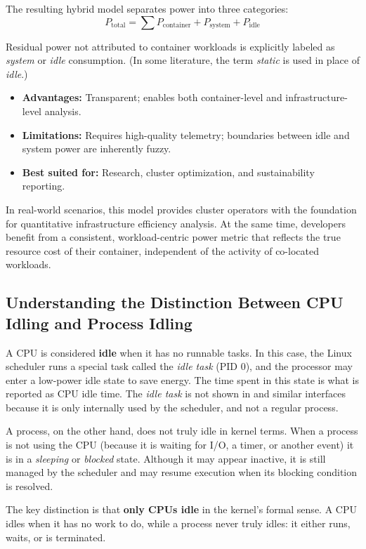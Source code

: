 The resulting hybrid model separates power into three categories:
\begin{equation}
    P_\text{total} = \sum P_\text{container} + P_\text{system} + P_\text{idle}
\end{equation}

Residual power not attributed to container workloads is explicitly labeled as \textit{system} or \textit{idle} consumption. (In some literature, the term \textit{static} is used in place of \textit{idle}.)

\begin{itemize}
    \item \textbf{Advantages:} Transparent; enables both container-level and infrastructure-level analysis.
    \item \textbf{Limitations:} Requires high-quality telemetry; boundaries between idle and system power are inherently fuzzy.
    \item \textbf{Best suited for:} Research, cluster optimization, and sustainability reporting.
\end{itemize}

In real-world scenarios, this model provides cluster operators with the foundation for quantitative infrastructure efficiency analysis. At the same time, developers benefit from a consistent, workload-centric power metric that reflects the true resource cost of their container, independent of the activity of co-located workloads.

\subsection{Understanding the Distinction Between CPU Idling and Process Idling}
A CPU is considered \textbf{idle} when it has no runnable tasks. In this case, the Linux scheduler runs a special task called the \textit{idle task} (PID 0), and the processor may enter a low-power idle state to save energy. The time spent in this state is what is reported as CPU idle time. The \textit{idle task} is not shown in  and similar interfaces because it is only internally used by the scheduler, and not a regular process.

A process, on the other hand, does not truly idle in kernel terms. When a process is not using the CPU (because it is waiting for I/O, a timer, or another event) it is in a \textit{sleeping} or \textit{blocked} state. Although it may appear inactive, it is still managed by the scheduler and may resume execution when its blocking condition is resolved.

The key distinction is that \textbf{only CPUs idle} in the kernel’s formal sense. A CPU idles when it has no work to do, while a process never truly idles: it either runs, waits, or is terminated.
